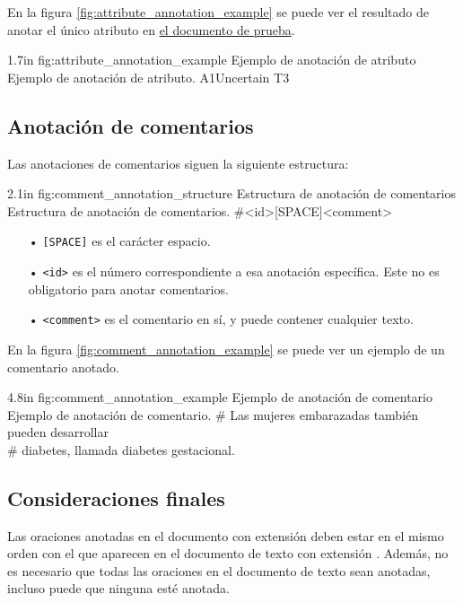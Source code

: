 En la figura \ref{fig:attribute_annotation_example} se puede ver el resultado de anotar el único atributo en \hyperref[sentence:annotation_example]{el documento de prueba}.

\begin{annexample}
	[backgroundcolor=cyan!13]
	{1.7in}
	{fig:attribute_annotation_example}
	{Ejemplo de anotación de atributo}
	{Ejemplo de anotación de atributo.}
	A1\space\space Uncertain T3
\end{annexample}

\subsection{Anotación de comentarios}
Las anotaciones de comentarios siguen la siguiente estructura:

\begin{annexample}
	[backgroundcolor=green!13]
	{2.1in}
	{fig:comment_annotation_structure}
	{Estructura de anotación de comentarios}
	{Estructura de anotación de comentarios.}
	\#<id>[SPACE]<comment>
\end{annexample}

\begin{itemize}
	\item[•] \texttt{[SPACE]} es el carácter espacio.
	\vspace{-0.1in}
	\item[•] \texttt{<id>} es el número correspondiente a esa anotación específica. Este no es obligatorio para anotar comentarios.
	\vspace{-0.1in}
	\item[•] \texttt{<comment>} es el comentario en sí, y puede contener cualquier texto.
\end{itemize}

En la figura \ref{fig:comment_annotation_example} se puede ver un ejemplo de un comentario anotado.

\begin{annexample}
	[backgroundcolor=cyan!13]
	{4.8in}
	{fig:comment_annotation_example}
	{Ejemplo de anotación de comentario}
	{Ejemplo de anotación de comentario.}
	\# Las mujeres embarazadas también pueden desarrollar\\
	\# diabetes, llamada diabetes gestacional.
\end{annexample}

\subsection{Consideraciones finales}
Las oraciones anotadas en el documento con extensión  deben estar en el mismo orden con el que aparecen en el documento de texto con extensión . Además, no es necesario que todas las oraciones en el documento de texto sean anotadas, incluso puede que ninguna esté anotada.

